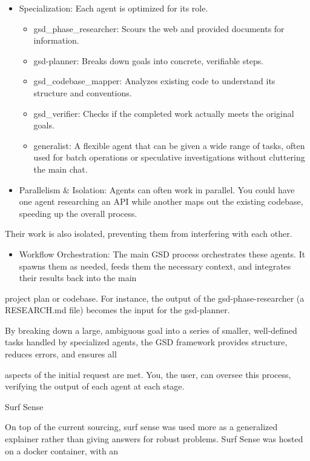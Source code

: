 \documentclass[
]{article}
\begin{document}
\begin{itemize}
\item
  Specialization: Each agent is optimized for its role.

  \begin{itemize}
  \item
    gsd\_phase\_researcher: Scours the web and provided documents for
    information.
  \item
    gsd-planner: Breaks down goals into concrete, verifiable steps.
  \item
    gsd\_codebase\_mapper: Analyzes existing code to understand its
    structure and conventions.
  \item
    gsd\_verifier: Checks if the completed work actually meets the
    original goals.
  \item
    generalist: A flexible agent that can be given a wide range of
    tasks, often used for batch operations or speculative investigations
    without cluttering the main chat.
  \end{itemize}
\item
  Parallelism \& Isolation: Agents can often work in parallel. You could
  have one agent researching an API while another maps out the existing
  codebase, speeding up the overall process.
\end{itemize}

Their work is also isolated, preventing them from interfering with each
other.

\begin{itemize}
\item
  Workflow Orchestration: The main GSD process orchestrates these
  agents. It spawns them as needed, feeds them the necessary context,
  and integrates their results back into the main
\end{itemize}

project plan or codebase. For instance, the output of the
gsd-phase-researcher (a RESEARCH.md file) becomes the input for the
gsd-planner.

By breaking down a large, ambiguous goal into a series of smaller,
well-defined tasks handled by specialized agents, the GSD framework
provides structure, reduces errors, and ensures all

aspects of the initial request are met. You, the user, can oversee this
process, verifying the output of each agent at each stage.

Surf Sense

On top of the current sourcing, surf sense was used more as a
generalized explainer rather than giving answers for robust problems.
Surf Sense was hosted on a docker container, with an
\end{document}

